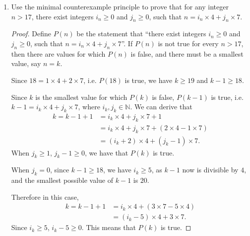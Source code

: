\documentclass[12pt,a4paper,UTF8]{article}
\theoremstyle{definition}
\begin{document}
\begin{enumerate}
\begin{proof}
        Assume that for any integer $n>2$, there is not a prime $p$ satisfying $n<p<n!$, i.e. no integer between $n$ and $n!$ is a prime. Thus $n!-1$ has at least one prime factor, which is not itself in this case. 
        Moreover, all natural numbers that are not larger than $n$ are divisors of $n!$, and none of them is divisor of $n!-1$, since $n!$ and $n!-1$ are co-prime. Therefore a prime factor of $n!-1$ must be larger than $n$, which means there is a prime $p$ satisfying $n<p<n!$. We have derived a contradiction,
        which allows us to conclude that our original assumption is false.
    \end{proof}


    \item
    Use the minimal counterexample principle to prove that for any integer $n>17$, there exist integers $i_n\ge 0$ and $j_n\ge 0$, such that $n = i_n \times 4 + j_n \times 7$.
    \begin{proof}
        Define $P(n)$ be the statement that \textquotedblleft there exist integers $i_n\ge 0$ and $j_n\ge 0$, such that $n = i_n \times 4 + j_n \times 7$\textquotedblright. If $P(n)$ is not true for every $n>17$, then there are values for which $P(n)$ is false, and there must be a smallest value, say $n=k$.
        
        Since $18=1\times4+2\times7$, i.e. $P(18)$ is true, we have $k\geq19$ and $k-1\geq18$. 
        
        Since $k$ is the smallest value for which $P(k)$ is false, $P(k-1)$ is true, i.e. $k-1=i_k\times4+j_k\times7$, where $i_k, j_k\in\mathbb{N}$. We can derive that
        \begin{align*}
        	k=k-1+1&=i_k\times4+j_k\times7+1\\
        	       &=i_k\times4+j_k\times7+(2\times4-1\times7)\\
        	       &=(i_k+2)\times4+(j_k-1)\times7.
        \end{align*}
        When $j_k\geq1$, $j_k-1\geq0$, we have that $P(k)$ is true.
        
        When $j_k=0$, since $k-1\geq18$, we have $i_k\geq5$, as $k-1$ now is divisible by $4$, and the smallest possible value of $k-1$ is $20$.
        
        Therefore in this case, 
        \begin{align*}
        	k=k-1+1&=i_k\times4+(3\times7-5\times4)\\
        	&=(i_k-5)\times4+3\times7.
        \end{align*}
        Since $i_k\geq5$, $i_k-5\geq0$. This means that $P(k)$ is true.
        

\end{proof}
\end{enumerate}
\end{document}
